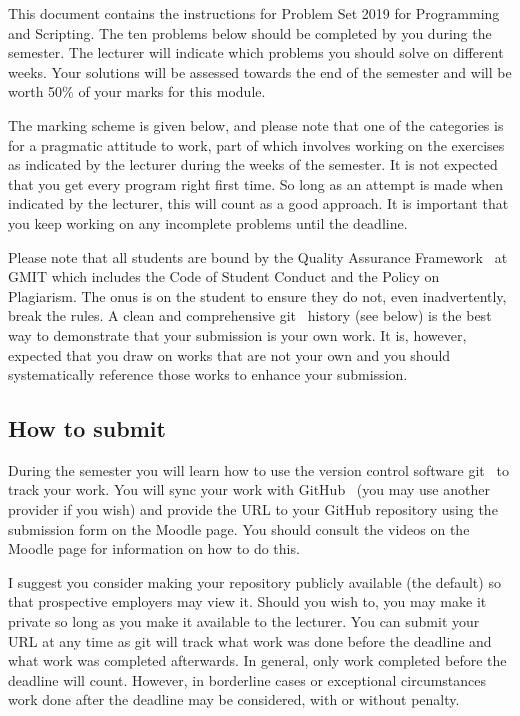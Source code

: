 \documentclass[a4paper, 12pt]{exam}
\title{\projectname}
\author{\modulename}
\date{Due: \duedate}
\newcommand{\modulename}{Programming and Scripting}
\newcommand{\projectyear}{2019}
\newcommand{\projectname}{Problem Set \projectyear}
\begin{document}
  
\maketitle

\noindent
This document contains the instructions for \projectname{} for \modulename{}.
The ten problems below should be completed by you during the semester.
The lecturer will indicate which problems you should solve on different weeks.
Your solutions will be assessed towards the end of the semester and will be worth 50\% of your marks for this module.

The marking scheme is given below, and please note that one of the categories is for a pragmatic attitude to work, part of which involves working on the exercises as indicated by the lecturer during the weeks of the semester.
It is not expected that you get every program right first time.
So long as an attempt is made when indicated by the lecturer, this will count as a good approach.
It is important that you keep working on any incomplete problems until the deadline.

Please note that all students are bound by the Quality Assurance Framework~\cite{gmitqaf} at GMIT which includes the Code of Student Conduct and the Policy on Plagiarism.
The onus is on the student to ensure they do not, even inadvertently, break the rules.
A clean and comprehensive git~\cite{git} history (see below) is the best way to demonstrate that your submission is your own work.
It is, however, expected that you draw on works that are not your own and you should systematically reference those works to enhance your submission.

\subsection*{How to submit}
During the semester you will learn how to use the version control software git~\cite{git} to track your work.
You will sync your work with GitHub~\cite{github} (you may use another provider if you wish) and provide the URL to your GitHub repository using the submission form on the Moodle page.
You should consult the videos on the Moodle page for information on how to do this.

I suggest you consider making your repository publicly available (the default) so that prospective employers may view it.
Should you wish to, you may make it private so long as you make it available to the lecturer.
You can submit your URL at any time as git will track what work was done before the deadline and what work was completed afterwards.
In general, only work completed before the deadline will count.
However, in borderline cases or exceptional circumstances work done after the deadline may be considered, with or without penalty.
\end{document}
